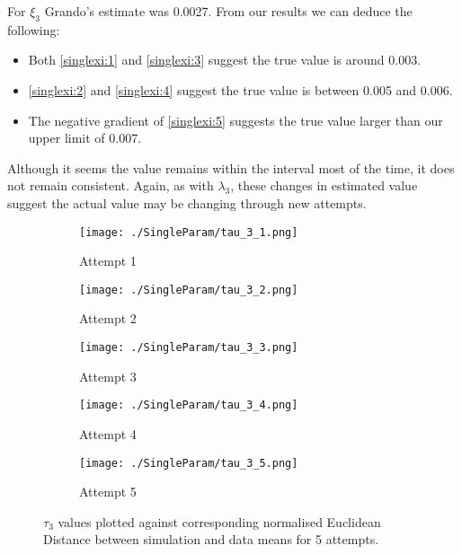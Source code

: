         For $\xi_3$ Grando's estimate was 0.0027. From our results we can deduce the following:
        \begin{itemize}
            \item Both \ref{singlexi:1} and \ref{singlexi:3} suggest the true value is around 0.003. 
            \item \ref{singlexi:2} and \ref{singlexi:4} suggest the true value is between 0.005 and 0.006.
            \item The negative gradient of \ref{singlexi:5} suggests the true value larger than our upper limit of 0.007.
        \end{itemize}
        Although it seems the value remains within the interval most of the time, it does not remain consistent. Again, as with $\lambda_3$, these changes in estimated value suggest the actual value may be changing through new attempts.







        \begin{figure}
            \begin{subfigure}{.3\textwidth}
            \centering
            \texttt{[image: ./SingleParam/tau\_3\_1.png]}
            \caption{Attempt 1}
            \label{singletau:1}
            \end{subfigure}
            \begin{subfigure}{.3\textwidth}
            \centering
            \texttt{[image: ./SingleParam/tau\_3\_2.png]}
            \caption{Attempt 2}
            \label{singletau:2}
            \end{subfigure}
            \begin{subfigure}{.3\textwidth}
                \centering
                \texttt{[image: ./SingleParam/tau\_3\_3.png]}
                \caption{Attempt 3}
                \label{singletau:3}
            \end{subfigure}

            \centering
            \begin{subfigure}{.3\textwidth} 
                \centering
                \texttt{[image: ./SingleParam/tau\_3\_4.png]}
                \caption{Attempt 4}
                \label{singletau:4}
            \end{subfigure}
            \begin{subfigure}{.3\textwidth}
                \centering
                \texttt{[image: ./SingleParam/tau\_3\_5.png]}
                \caption{Attempt 5}
                \label{singletau:5}
            \end{subfigure}

            \caption{$\tau_3$ values plotted against corresponding normalised Euclidean Distance between simulation and data means for 5 attempts.}
            \label{singletau}
        \end{figure}


